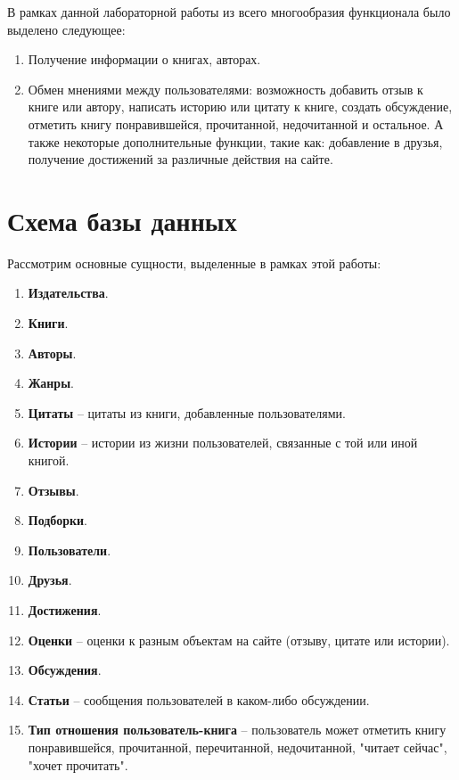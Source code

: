 \documentclass[a4paper,12pt]{article}
\begin{document}
В рамках данной лабораторной работы из всего многообразия функционала было выделено следующее:
\begin{enumerate}
    \item Получение информации о книгах, авторах.
    \item Обмен мнениями между пользователями: возможность добавить отзыв к книге или автору, написать историю или цитату к книге, создать обсуждение, отметить книгу понравившейся, прочитанной, недочитанной и остальное. А также некоторые дополнительные функции, такие как: добавление в друзья, получение достижений за различные действия на сайте.
\end{enumerate}


\newpage
\section{Схема базы данных}

Рассмотрим основные сущности, выделенные в рамках этой работы:

\begin{enumerate}
    \item \textbf{Издательства}.
    \item \textbf{Книги}.
    \item \textbf{Авторы}.
    \item \textbf{Жанры}.
    \item \textbf{Цитаты} -- цитаты из книги, добавленные пользователями.
    \item \textbf{Истории} -- истории из жизни пользователей, связанные с той или иной книгой.
    \item \textbf{Отзывы}.
    \item \textbf{Подборки}.
    \item \textbf{Пользователи}.
    \item \textbf{Друзья}.
    \item \textbf{Достижения}.
    \item \textbf{Оценки} -- оценки к разным объектам на сайте (отзыву, цитате или истории).
    \item \textbf{Обсуждения}.
    \item \textbf{Статьи} -- сообщения пользователей в каком-либо обсуждении.
    \item \textbf{Тип отношения пользователь-книга} -- пользователь может отметить книгу понравившейся, прочитанной, перечитанной, недочитанной, "читает сейчас", "хочет прочитать".
\end{enumerate}
\end{document}
